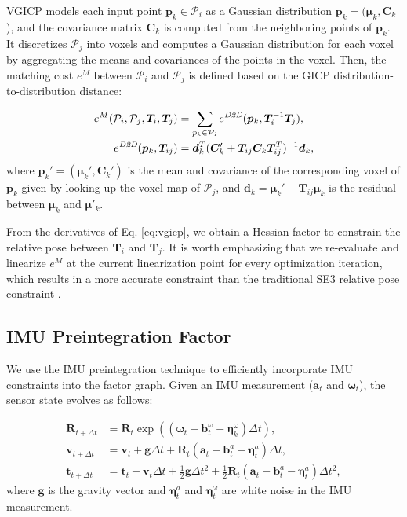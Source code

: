\documentclass[letterpaper, 10 pt, conference]{ieeeconf}  %
\begin{document}
VGICP models each input point ${\bm p}_k \in \mathcal{P}_i$ as a Gaussian distribution ${\bm p}_k = ({\bm \mu}_k, {\bm C}_k$), and the covariance matrix ${\bm C}_k$ is computed from the neighboring points of ${\bm p}_k$. It discretizes $\mathcal{P}_j$ into voxels and computes a Gaussian distribution for each voxel by aggregating the means and covariances of the points in the voxel. Then, the matching cost $e^M$ between $\mathcal{P}_i$ and $\mathcal{P}_j$ is defined based on the GICP distribution-to-distribution distance:

\begin{align}
\label{eq:vgicp}
e^M(\mathcal{P}_i, \mathcal{P}_j, {\bm T}_i, {\bm T}_j) &= \sum_{p_k \in \mathcal{P}_i} e^{\text{\it D2D}}({\bm p}_k, {\bm T}_i^{-1} {\bm T}_j), \\
e^{\text{\it D2D}} ({\bm p}_k, {\bm T}_{ij}) &= {\bm d}_k^T ({\bm C}'_k + {\bm T}_{ij}{\bm C}_k{\bm T}_{ij}^T)^{-1} {\bm d}_k,
\end{align}
where ${\bm p}_k' = ({\bm \mu}_k', {\bm C}_k')$ is the mean and covariance of the corresponding voxel of ${\bm p}_k$ given by looking up the voxel map of $\mathcal{P}_j$, and ${\bm d}_k = {\bm \mu}_k' - {\bm T}_{ij} {\bm \mu}_k$ is the residual between ${\bm \mu}_k$ and ${\bm \mu}'_k$.

From the derivatives of Eq. \ref{eq:vgicp}, we obtain a Hessian factor to constrain the relative pose between ${\bm T}_i$ and ${\bm T}_j$. It is worth emphasizing that we re-evaluate and linearize $e^M$ at the current linearization point for every optimization iteration, which results in a more accurate constraint than the traditional SE3 relative pose constraint \cite{koide_ral2021}.

\subsection{IMU Preintegration Factor}
\label{sec:imu_preintegration_factor}

We use the IMU preintegration technique \cite{Forster2017} to efficiently incorporate IMU constraints into the factor graph. Given an IMU measurement (${\bm a}_t$ and ${\bm \omega}_t$), the sensor state evolves as follows:

\begin{align}
\label{eq:imu_evol_R}
{\bm R}_{t + \Delta t} &= {\bm R}_t \exp \left( \left( {\bm \omega}_t - {\bm b}_t^{\omega} - {\bm \eta}_k^{\omega} \right) \Delta t \right), \\
\label{eq:imu_evol_v}
{\bm v}_{t + \Delta t} &= {\bm v}_t + {\bm g} \Delta t + {\bm R}_t \left( {\bm a}_t - {\bm b}_t^a - {\bm \eta}_t^a \right) \Delta t, \\
\label{eq:imu_evol_p}
{\bm t}_{t + \Delta t} &= {\bm t}_t + {\bm v}_t \Delta t + \frac{1}{2} {\bm g} \Delta t^2 + \frac{1}{2} {\bm R}_t \left( {\bm a}_t - {\bm b}_t^a - {\bm \eta}_t^a \right) \Delta t^2,
\end{align}
where ${\bm g}$ is the gravity vector and ${\bm \eta}_t^a$ and ${\bm \eta}_t^{\omega}$ are white noise in the IMU measurement.
\end{document}
